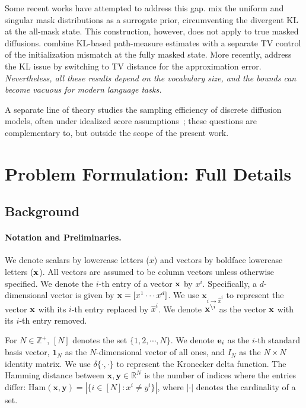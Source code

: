 \documentclass{article} %
\newcommand{\bfe}{{\bf e}}
\newcommand{\bfx}{{\bf x}}
\newcommand{\xito}{\mathbf{x}_{i \to \hat{x}^i}}
\begin{document}
Some recent works have attempted to address this gap. \citet{liang2026absorb,dmitriev2026efficient} mix the uniform and singular mask distributions as a surrogate prior, circumventing the divergent KL at the all-mask state. This construction, however, does not apply to true masked diffusions. \citet{conforti2025non} combine KL-based path-measure estimates with a separate TV control of the initialization mismatch at the fully masked state. More recently, \citet{liang2026sharp} address the KL issue by switching to TV distance for the approximation error. \emph{Nevertheless, all these results depend on the vocabulary size, and the bounds can become vacuous for modern language tasks.}

A separate line of theory studies the sampling efficiency of discrete diffusion models, often under idealized score assumptions~\cite{chen2025optimal,li2026breaking,liang2026convergence}; these questions are complementary to, but outside the scope of the present work.

\section{Problem Formulation: Full Details}\label{sec:setup_full}
\subsection{Background}

\paragraph{Notation and Preliminaries.} We denote scalars by lowercase letters ($x$) and vectors by boldface lowercase letters ($\bfx$). All vectors are assumed to be column vectors unless otherwise specified. We denote the $i$-th entry of a vector $\bfx$ by $x^i$. Specifically, a $d$-dimensional vector is given by $\bfx=[x^1 \dotsm x^d]$. We use $\xito$ to represent the vector $\bfx$ with its $i$-th entry replaced by $\hat{x}^i$. We denote $\bfx^{\backslash i}$ as the vector $\bfx$ with its $i$-th entry removed. 

For $N\in \mathbb{Z}^+$, $[N]$ denotes the set $\{1,2,\dotsm,N\}$. We denote $\bfe_i$ as the $i$-th standard basis vector, $\mathbf{1}_N$ as the $N$-dimensional vector of all ones, and $I_N$ as the $N \times N$ identity matrix. We use $\delta \{ \cdot, \cdot \}$ to represent the Kronecker delta function. The Hamming distance between $\mathbf{x}, \mathbf{y} \in \mathbb{R}^N$ is the number of indices where the entries differ: $\text{Ham}(\mathbf{x}, \mathbf{y}) = |\{i \in [N] : x^i \neq y^i\}|$, where $| \cdot|$ denotes the cardinality of a set. 
\end{document}
